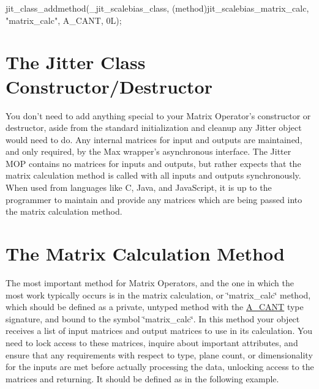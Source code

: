 \begin{DoxyCode}
   jit_class_addmethod(_jit_scalebias_class, 
      (method)jit_scalebias_matrix_calc,
      "matrix_calc", A_CANT, 0L);
\end{DoxyCode}
\hypertarget{chapter_jit_mopqs_chapter_jit_mopqs_ctordtor}{}\section{The Jitter Class Constructor/Destructor}\label{chapter_jit_mopqs_chapter_jit_mopqs_ctordtor}
You don't need to add anything special to your Matrix Operator's constructor or destructor, aside from the standard initialization and cleanup any Jitter object would need to do. Any internal matrices for input and outputs are maintained, and only required, by the Max wrapper's asynchronous interface. The Jitter MOP contains no matrices for inputs and outputs, but rather expects that the matrix calculation method is called with all inputs and outputs synchronously. When used from languages like C, Java, and JavaScript, it is up to the programmer to maintain and provide any matrices which are being passed into the matrix calculation method.\hypertarget{chapter_jit_mopqs_chapter_jit_mopqs_calc}{}\section{The Matrix Calculation Method}\label{chapter_jit_mopqs_chapter_jit_mopqs_calc}
The most important method for Matrix Operators, and the one in which the most work typically occurs is in the matrix calculation, or \char`\"{}matrix\_\-calc\char`\"{} method, which should be defined as a private, untyped method with the \hyperlink{group__atom_gga8aa6700e9f00b132eb376db6e39ade47af48193ec36e53b1507d81c49873c8d7a}{A\_\-CANT} type signature, and bound to the symbol \char`\"{}matrix\_\-calc\char`\"{}. In this method your object receives a list of input matrices and output matrices to use in its calculation. You need to lock access to these matrices, inquire about important attributes, and ensure that any requirements with respect to type, plane count, or dimensionality for the inputs are met before actually processing the data, unlocking access to the matrices and returning. It should be defined as in the following example.


